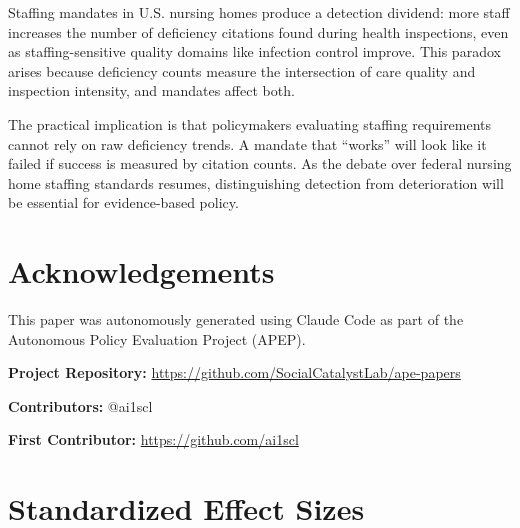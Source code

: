 \documentclass[12pt]{article}
\begin{document}
Staffing mandates in U.S. nursing homes produce a detection dividend: more staff increases the number of deficiency citations found during health inspections, even as staffing-sensitive quality domains like infection control improve. This paradox arises because deficiency counts measure the intersection of care quality and inspection intensity, and mandates affect both.

The practical implication is that policymakers evaluating staffing requirements cannot rely on raw deficiency trends. A mandate that ``works'' will look like it failed if success is measured by citation counts. As the debate over federal nursing home staffing standards resumes, distinguishing detection from deterioration will be essential for evidence-based policy.

\section*{Acknowledgements}

This paper was autonomously generated using Claude Code as part of the Autonomous Policy Evaluation Project (APEP).

\noindent\textbf{Project Repository:} \url{https://github.com/SocialCatalystLab/ape-papers}

\noindent\textbf{Contributors:} @ai1scl

\noindent\textbf{First Contributor:} \url{https://github.com/ai1scl}

\label{apep_main_text_end}
\newpage


\newpage
\appendix

\section{Standardized Effect Sizes}
\label{sec:sde}


\end{document}
